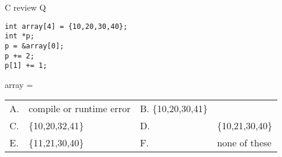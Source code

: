\begin{frame}[fragile]{C review Q}
\lstset{language=C,style=smaller}
\begin{lstlisting}
int array[4] = {10,20,30,40};
int *p;
p = &array[0];
p += 2;
p[1] += 1;
\end{lstlisting}
array = \\
\begin{tabular}{llll}
A. & compile or runtime error   & B. \{10,20,30,41\} \\
C. & \{10,20,32,41\} & D. & \{10,21,30,40\} \\
E. & \{11,21,30,40\} & F. & none of these \\
\end{tabular}
\end{frame}
